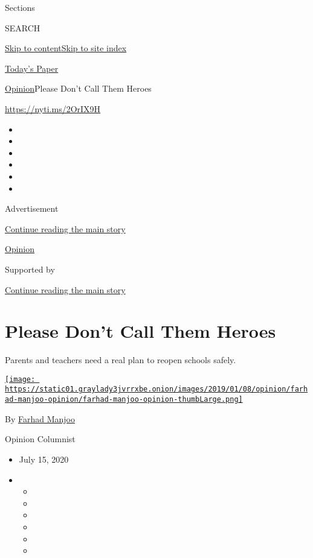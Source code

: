Sections

SEARCH

\protect\hyperlink{site-content}{Skip to
content}\protect\hyperlink{site-index}{Skip to site index}

\href{https://myaccount.nytimes3xbfgragh.onion/auth/login?response_type=cookie\&client_id=vi}{}

\href{https://www.nytimes3xbfgragh.onion/section/todayspaper}{Today's
Paper}

\href{/section/opinion}{Opinion}\textbar{}Please Don't Call Them Heroes

\url{https://nyti.ms/2OrIX9H}

\begin{itemize}
\item
\item
\item
\item
\item
\item
\end{itemize}

Advertisement

\protect\hyperlink{after-top}{Continue reading the main story}

\href{/section/opinion}{Opinion}

Supported by

\protect\hyperlink{after-sponsor}{Continue reading the main story}

\hypertarget{please-dont-call-them-heroes}{%
\section{Please Don't Call Them
Heroes}\label{please-dont-call-them-heroes}}

Parents and teachers need a real plan to reopen schools safely.

\href{https://www.nytimes3xbfgragh.onion/by/farhad-manjoo}{\texttt{[image: https://static01.graylady3jvrrxbe.onion/images/2019/01/08/opinion/farhad-manjoo-opinion/farhad-manjoo-opinion-thumbLarge.png]}}

By \href{https://www.nytimes3xbfgragh.onion/by/farhad-manjoo}{Farhad
Manjoo}

Opinion Columnist

\begin{itemize}
\item
  July 15, 2020
\item
  \begin{itemize}
  \item
  \item
  \item
  \item
  \item
  \item
  \end{itemize}
\end{itemize}

